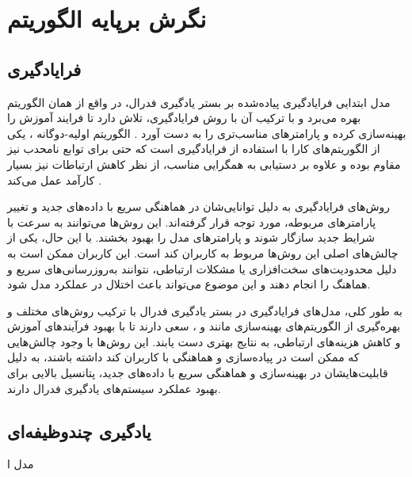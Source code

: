 \section{نگرش برپایه الگوریتم}
\subsection{فرایادگیری}
مدل ابتدایی فرایادگیری پیاده‌شده بر بستر یادگیری فدرال، در واقع از همان الگوریتم
بهره می‌برد و با ترکیب آن با روش فرایادگیری، تلاش دارد تا فرایند آموزش را بهینه‌سازی کرده و پارامترهای مناسب‌تری را به دست آورد
\cite{jiang2019improving}.
الگوریتم اولیه-دوگانه%
%
، یکی از الگوریتم‌های کارا با استفاده از فرایادگیری است که حتی برای توابع نامحدب%
نیز مقاوم بوده و علاوه بر دستیابی به همگرایی مناسب، از نظر کاهش ارتباطات نیز بسیار کارآمد عمل می‌کند
\cite{zhang2021fedpd}.

روش‌های فرایادگیری به دلیل توانایی‌شان در هماهنگی سریع با داده‌های جدید و تغییر پارامترهای مربوطه، مورد توجه قرار گرفته‌اند. این روش‌ها می‌توانند به سرعت با شرایط جدید سازگار شوند و پارامترهای مدل را بهبود بخشند. با این حال، یکی از چالش‌های اصلی این روش‌ها مربوط به کاربران کند است. این کاربران ممکن است به دلیل محدودیت‌های سخت‌افزاری یا مشکلات ارتباطی، نتوانند به‌روزرسانی‌های سریع و هماهنگ را انجام دهند و این موضوع می‌تواند باعث اختلال در عملکرد مدل شود.

به طور کلی، مدل‌های فرایادگیری در بستر یادگیری فدرال با ترکیب روش‌های مختلف و بهره‌گیری از الگوریتم‌های بهینه‌سازی مانند
و
%
، سعی دارند تا با بهبود فرآیندهای آموزش و کاهش هزینه‌های ارتباطی، به نتایج بهتری دست یابند. این روش‌ها با وجود چالش‌هایی که ممکن است در پیاده‌سازی و هماهنگی با کاربران کند داشته باشند، به دلیل قابلیت‌هایشان در بهینه‌سازی و هماهنگی سریع با داده‌های جدید، پتانسیل بالایی برای بهبود عملکرد سیستم‌های یادگیری فدرال دارند.

\subsection{یادگیری چندوظیفه‌ای}
مدل ا






